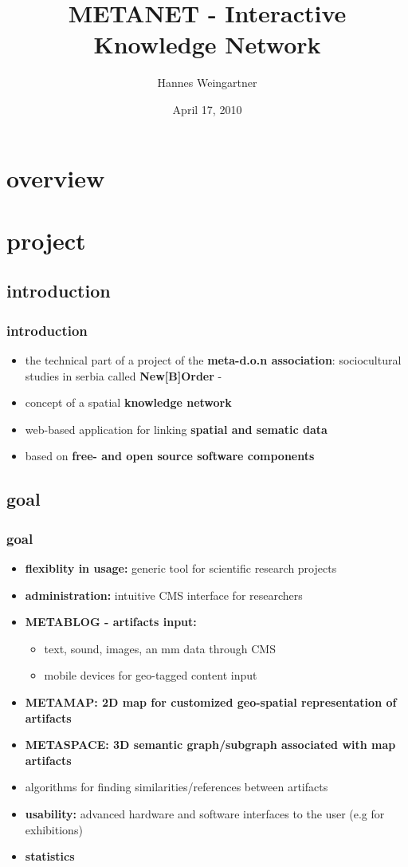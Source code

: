 \documentclass[blue]{beamer}
\title{METANET - Interactive Knowledge Network}
\institute[META-D.O.N]{META-D.O.N\\Association for Cultural Substitution Services}
\author{Hannes Weingartner}
\date{April 17, 2010}
\begin{document}
\frame{\titlepage}

\section*{overview}
\frame{\tableofcontents}




\section{project}
\subsection{introduction}
\frame
{
\frametitle{\textbf{introduction}}
\begin{itemize}
\item the technical part of a project of the\textbf{ meta-d.o.n association}: sociocultural studies in serbia called \textbf{New[B]Order} - 
\item concept of a spatial \textbf{knowledge network}
\item web-based application for linking \textbf{spatial and sematic data}
\item based on \textbf{free- and open source software components}
\end{itemize}
}

\subsection{goal}
\frame
{
\frametitle{\textbf{goal}}
\begin{itemize}
\item \textbf{flexiblity in usage:} generic tool for scientific research projects
\item \textbf{administration:} intuitive CMS interface for researchers
\item \textbf{METABLOG - artifacts input:}
  \begin{itemize}
    \item text, sound, images, an mm data through CMS
    \item mobile devices for geo-tagged content input
  \end{itemize}
\item \textbf{METAMAP: 2D map for customized geo-spatial representation of artifacts}
\item \textbf{METASPACE: 3D semantic graph/subgraph associated with map artifacts}
\item algorithms for finding similarities/references between artifacts
\item \textbf{usability:} advanced hardware and software interfaces to the user (e.g for exhibitions)
\item \textbf{statistics}
\end{itemize}
}
\end{document}
